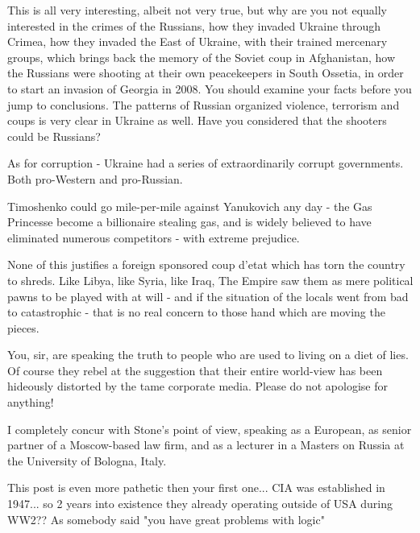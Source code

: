 \begin{itemize}

This is all very interesting, albeit not very true, but why are you not equally
interested in the crimes of the Russians, how they invaded Ukraine through
Crimea, how they invaded the East of Ukraine, with their trained mercenary
groups, which brings back the memory of the Soviet coup in Afghanistan, how the
Russians were shooting at their own peacekeepers in South Ossetia, in order to
start an invasion of Georgia in 2008. You should examine your facts before you
jump to conclusions. The patterns of Russian organized violence, terrorism and
coups is very clear in Ukraine as well. Have you considered that the shooters
could be Russians?


As for corruption - Ukraine had a series of extraordinarily corrupt
governments. Both pro-Western and pro-Russian.

Timoshenko could go mile-per-mile against Yanukovich any day - the Gas
Princesse become a billionaire stealing gas, and is widely believed to have
eliminated numerous competitors - with extreme prejudice.

None of this justifies a foreign sponsored coup d'etat which has torn the
country to shreds. Like Libya, like Syria, like Iraq, The Empire saw them as
mere political pawns to be played with at will - and if the situation of the
locals went from bad to catastrophic - that is no real concern to those hand
which are moving the pieces.


You, sir, are speaking the truth to people who are used to living on a diet of
lies. Of course they rebel at the suggestion that their entire world-view has
been hideously distorted by the tame corporate media. Please do not apologise
for anything!

\begin{itemize} %

I completely concur with Stone's point of view, speaking as a European, as
senior partner of a Moscow-based law firm, and as a lecturer in a Masters on
Russia at the University of Bologna, Italy.

\end{itemize} %


This post is even more pathetic then your first one... CIA was established in
1947... so 2 years into existence they already operating outside of USA during
WW2?? As somebody said "you have great problems with logic"


\end{itemize}
